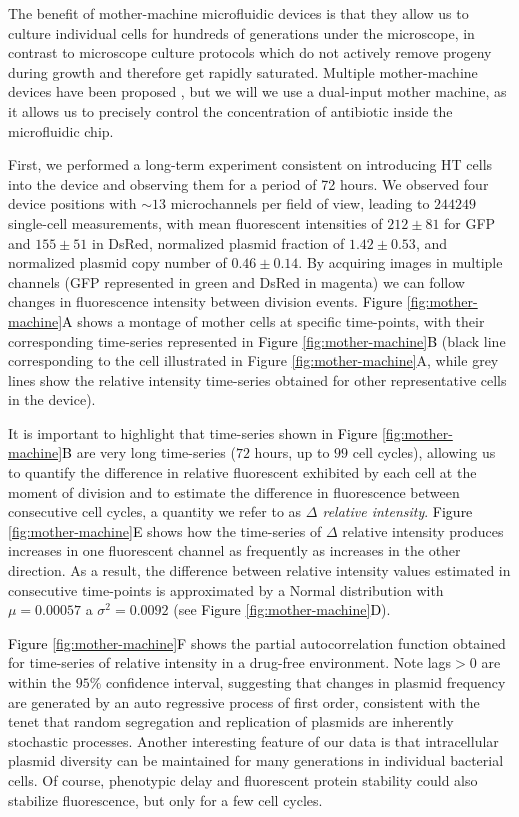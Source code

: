 \documentclass[fleqn,12pt]{wlscirep}
\newcommand{\fig}[1]{\textcolor{black}{#1}}
\begin{document}
The benefit of mother-machine microfluidic devices is that they allow us to culture individual cells for hundreds of generations under the microscope, in contrast to microscope culture protocols which do not actively remove progeny during growth and therefore get rapidly saturated.  Multiple mother-machine devices have been proposed \cite{taheri2015single,long2013microfluidic}, but we will we use a dual-input mother machine\cite{Kaiser2018}, as it allows us to precisely control the concentration of antibiotic inside the microfluidic chip.  

First, we performed a long-term experiment consistent on introducing HT cells into the device and observing them for a period of 72 hours. 
We observed four device positions with $\sim 13$ microchannels per field of view, leading to $244249$ single-cell measurements, with mean fluorescent intensities of $212\pm 81 $ for GFP and $155\pm 51$ in DsRed, normalized plasmid fraction of $1.42\pm 0.53$, and normalized plasmid copy number of $0.46\pm 0.14$. 
By acquiring images in multiple channels (GFP represented in green and DsRed in magenta) we can follow changes in fluorescence intensity between division events.  
\fig{Figure \ref{fig:mother-machine}A} shows a montage of mother cells at specific time-points, with their corresponding time-series represented in \fig{Figure \ref{fig:mother-machine}B} (black line corresponding to the cell illustrated in Figure \ref{fig:mother-machine}A, while grey lines show the relative intensity time-series obtained for other representative cells in the device). 

It is important to highlight that time-series shown in \fig{Figure \ref{fig:mother-machine}B} are very long time-series ($72$ hours,  up to $99$ cell cycles), allowing us to quantify the difference in relative fluorescent exhibited by each cell at the moment of division and to estimate the difference in fluorescence between consecutive cell cycles, a quantity we refer to as {\em $\Delta$ relative intensity}.  \fig{Figure \ref{fig:mother-machine}E} shows how the time-series of $\Delta$ relative intensity produces increases in one fluorescent channel as frequently as increases in the other direction.
As a result, the difference between relative intensity values estimated in consecutive time-points is approximated by a Normal distribution with $\mu=0.00057$ a $\sigma^2=0.0092$ (see \fig{Figure \ref{fig:mother-machine}D}).

\fig{Figure \ref{fig:mother-machine}F} shows the partial autocorrelation function obtained for time-series of relative intensity in a drug-free environment. Note lags$>0$ are within the $95\%$ confidence interval, suggesting that changes in plasmid frequency are generated by an auto regressive process of first order, consistent with the tenet that random segregation and replication of plasmids are inherently stochastic processes.
Another interesting feature of our data is that intracellular plasmid diversity can be maintained for many generations in individual bacterial cells. Of course, phenotypic delay\cite{Sun2018} and fluorescent protein stability\cite{Balleza2018} could also stabilize fluorescence, but only for a few cell cycles. 
\end{document}
